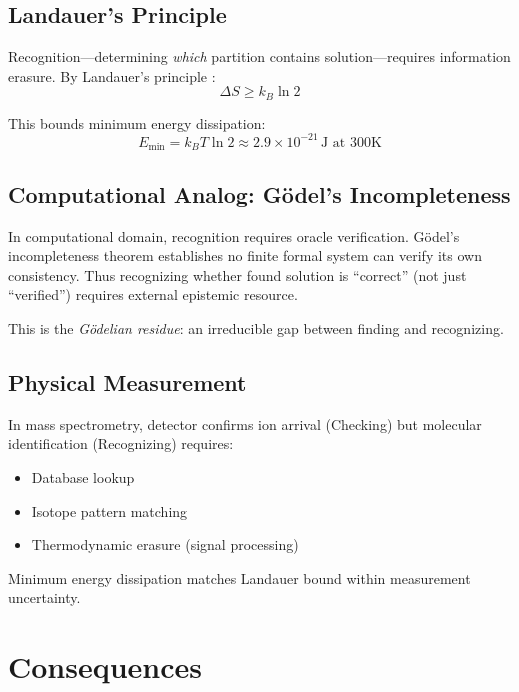 \documentclass[twocolumn,aps,prl,superscriptaddress,floatfix]{revtex4-2}
\begin{document}
\subsection{Landauer's Principle}

Recognition—determining \emph{which} partition contains solution—requires information erasure. By Landauer's principle \cite{Landauer1961}:
\begin{equation}
\Delta S \geq k_B \ln 2
\end{equation}

This bounds minimum energy dissipation:
\begin{equation}
E_{\min} = k_B T \ln 2 \approx 2.9 \times 10^{-21} \, \text{J at } 300\text{K}
\end{equation}

\subsection{Computational Analog: G\"odel's Incompleteness}

In computational domain, recognition requires oracle verification. G\"odel's incompleteness theorem \cite{Godel1931} establishes no finite formal system can verify its own consistency. Thus recognizing whether found solution is ``correct'' (not just ``verified'') requires external epistemic resource.

This is the \emph{G\"odelian residue}: an irreducible gap between finding and recognizing.

\subsection{Physical Measurement}

In mass spectrometry, detector confirms ion arrival (Checking) but molecular identification (Recognizing) requires:
\begin{itemize}
\item Database lookup
\item Isotope pattern matching
\item Thermodynamic erasure (signal processing)
\end{itemize}

Minimum energy dissipation matches Landauer bound within measurement uncertainty.

\section{Consequences}
\end{document}
